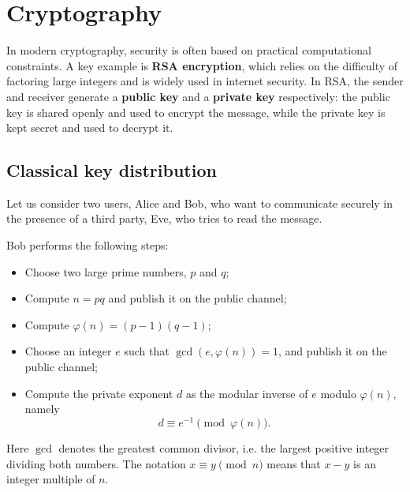 \section{Cryptography}\label{sec:5-cryptography}


In modern cryptography, security is often based on practical computational constraints. A key example is \textbf{RSA encryption}, which relies on the difficulty of factoring large integers and is widely used in internet security. In RSA, the sender and receiver generate a \textbf{public key} and a \textbf{private key} respectively: the public key is shared openly and used to encrypt the message, while the private key is kept secret and used to decrypt it.

\subsection{Classical key distribution}\label{subsec:5-classical-key-distribution}
Let us consider two users, Alice and Bob, who want to communicate securely in the presence of a third party, Eve, who tries to read the message.

Bob performs the following steps:
\begin{itemize}
    \item Choose two large prime numbers, $p$ and $q$;
    \item Compute $n = p q$ and publish it on the public channel;
    \item Compute $\varphi(n) = (p-1)(q-1)$;
    \item Choose an integer $e$ such that $\gcd(e,\varphi(n))=1$, and publish it on the public channel;
    \item Compute the private exponent $d$ as the modular inverse of $e$ modulo $\varphi(n)$, namely
    \[
    d \equiv e^{-1} \pmod{\varphi(n)}.
    \]
\end{itemize}

Here $\gcd$ denotes the greatest common divisor, i.e. the largest positive integer dividing both numbers. The notation $x \equiv y \pmod{n}$ means that $x-y$ is an integer multiple of $n$.

